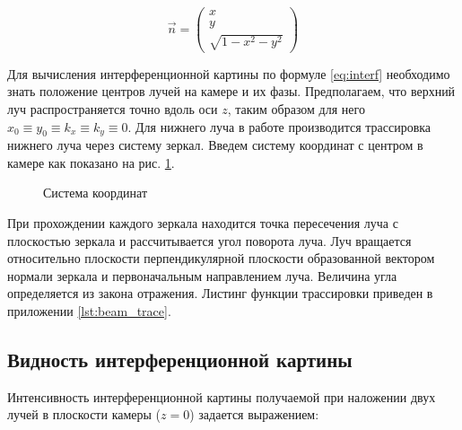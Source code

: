 \begin{equation}
    \vec{n} = \begin{pmatrix}
        x\\ 
        y\\ 
        \sqrt{1 - x^2 - y^2}
    \end{pmatrix}
\end{equation}


Для вычисления интерференционной картины по формуле \ref{eq:interf} необходимо знать положение центров лучей на камере и их фазы. Предполагаем, что верхний луч распространяется точно вдоль оси  $z$, таким образом для него $x_0\equiv y_0\equiv k_x\equiv k_y\equiv 0$. Для нижнего луча в работе производится трассировка нижнего луча через систему зеркал. Введем систему координат с центром в камере как показано на рис. \ref{fig:MZI_coordis}. 


\begin{figure}[ht]
\caption{Система координат}
\label{fig:MZI_coordis}
\end{figure}

При прохождении каждого зеркала находится точка пересечения луча с плоскостью зеркала и рассчитывается угол поворота луча. Луч вращается относительно плоскости перпендикулярной плоскости образованной вектором нормали зеркала и первоначальным направлением луча. Величина угла определяется из закона отражения. Листинг функции трассировки приведен в приложении \ref{lst:beam_trace}.


\subsection{Видность интерференционной картины}

Интенсивность интерференционной картины получаемой при наложении двух лучей в плоскости камеры ($z=0$) задается выражением:

